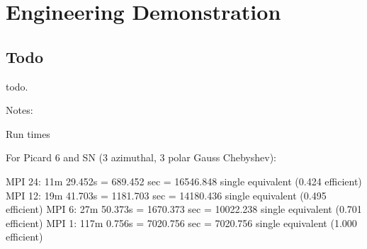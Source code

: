 
\chapter{Engineering Demonstration} %

\label{Chapter7} %



\section{Todo}
todo.

Notes:

Run times

For Picard 6 and SN (3 azimuthal, 3 polar Gauss Chebyshev):

MPI 24: 11m 29.452s = 689.452 sec =  16546.848 single equivalent (0.424 efficient)
MPI 12: 19m 41.703s = 1181.703 sec = 14180.436 single equivalent (0.495 efficient)
MPI  6: 27m 50.373s = 1670.373 sec = 10022.238 single equivalent (0.701 efficient)
MPI  1: 117m 0.756s = 7020.756 sec =  7020.756 single equivalent (1.000 efficient)
